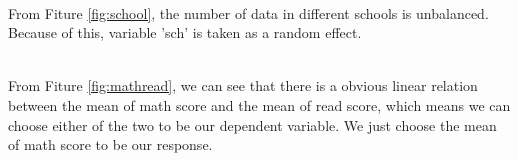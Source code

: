 \documentclass{article}
\begin{document}
\begin{minipage}{\linewidth}
    \label{fig:school}
\end{minipage}\\

From Fiture \ref{fig:school}, the number of data in different schools is unbalanced. Because of this, 
variable 'sch' is taken as a random effect.\\

\begin{minipage}{\linewidth}
    \label{fig:mathread}
\end{minipage}\\

From Fiture \ref{fig:mathread}, we can see that there is a obvious linear relation between the mean of math score and the mean of read score, 
which means we can choose either of the two to be our dependent variable. We just choose the mean of math score to be our response.\\
\end{document}
